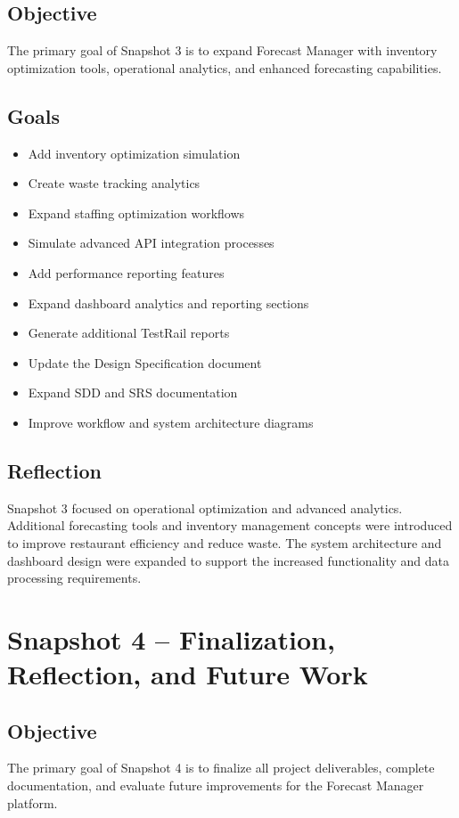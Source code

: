 \documentclass[12pt]{article}
\begin{document}
\subsection{Objective}
The primary goal of Snapshot 3 is to expand Forecast Manager with inventory optimization tools, operational analytics, and enhanced forecasting capabilities.

\subsection{Goals}
\begin{itemize}
\item Add inventory optimization simulation
\item Create waste tracking analytics
\item Expand staffing optimization workflows
\item Simulate advanced API integration processes
\item Add performance reporting features
\item Expand dashboard analytics and reporting sections
\item Generate additional TestRail reports
\item Update the Design Specification document
\item Expand SDD and SRS documentation
\item Improve workflow and system architecture diagrams
\end{itemize}

\subsection{Reflection}
Snapshot 3 focused on operational optimization and advanced analytics. Additional forecasting tools and inventory management concepts were introduced to improve restaurant efficiency and reduce waste. The system architecture and dashboard design were expanded to support the increased functionality and data processing requirements.

\newpage

\section{Snapshot 4 -- Finalization, Reflection, and Future Work}

\subsection{Objective}
The primary goal of Snapshot 4 is to finalize all project deliverables, complete documentation, and evaluate future improvements for the Forecast Manager platform.
\end{document}
